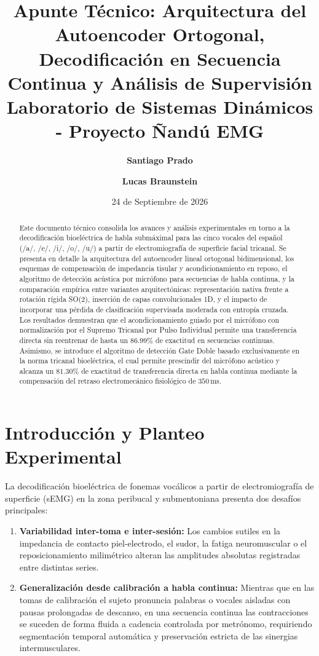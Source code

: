 \documentclass[11pt,a4paper]{article}
\title{\textbf{Apunte Técnico: Arquitectura del Autoencoder Ortogonal, Decodificación en Secuencia Continua y Análisis de Supervisión}\\
\large Laboratorio de Sistemas Dinámicos - Proyecto Ñandú EMG}
\author{\textbf{Santiago Prado} \and \textbf{Lucas Braunstein}}
\date{24 de Septiembre de 2026}
\begin{document}
\maketitle

\begin{abstract}
Este documento técnico consolida los avances y análisis experimentales en torno a la decodificación bioeléctrica de habla submáximal para las cinco vocales del español (/a/, /e/, /i/, /o/, /u/) a partir de electromiografía de superficie facial tricanal. Se presenta en detalle la arquitectura del autoencoder lineal ortogonal bidimensional, los esquemas de compensación de impedancia tisular y acondicionamiento en reposo, el algoritmo de detección acústica por micrófono para secuencias de habla continua, y la comparación empírica entre variantes arquitectónicas: representación nativa frente a rotación rígida SO(2), inserción de capas convolucionales 1D, y el impacto de incorporar una pérdida de clasificación supervisada moderada con entropía cruzada. Los resultados demuestran que el acondicionamiento guiado por el micrófono con normalización por el Supremo Tricanal por Pulso Individual permite una transferencia directa sin reentrenar de hasta un $86.99\%$ de exactitud en secuencias continuas. Asimismo, se introduce el algoritmo de detección Gate Doble basado exclusivamente en la norma tricanal bioeléctrica, el cual permite prescindir del micrófono acústico y alcanza un $81.30\%$ de exactitud de transferencia directa en habla continua mediante la compensación del retraso electromecánico fisiológico de $350\,\text{ms}$.
\end{abstract}

\vspace{0.3cm}
\tableofcontents
\newpage

\section{Introducción y Planteo Experimental}
\label{sec:introduccion}

La decodificación bioeléctrica de fonemas vocálicos a partir de electromiografía de superficie (sEMG) en la zona peribucal y submentoniana presenta dos desafíos principales:
\begin{enumerate}
    \item \textbf{Variabilidad inter-toma e inter-sesión:} Los cambios sutiles en la impedancia de contacto piel-electrodo, el sudor, la fatiga neuromuscular o el reposicionamiento milimétrico alteran las amplitudes absolutas registradas entre distintas series.
    \item \textbf{Generalización desde calibración a habla continua:} Mientras que en las tomas de calibración el sujeto pronuncia palabras o vocales aisladas con pausas prolongadas de descanso, en una secuencia continua las contracciones se suceden de forma fluida a cadencia controlada por metrónomo, requiriendo segmentación temporal automática y preservación estricta de las sinergias intermusculares.
\end{enumerate}
\end{document}
